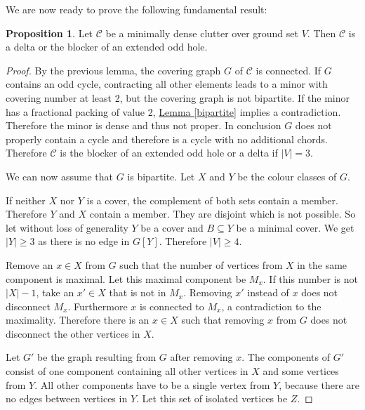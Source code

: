 \documentclass[a4paper, 12pt, twoside=false]{scrbook}
\theoremstyle{definition}
\newtheorem{proposition}[theorem]{Proposition}
\begin{document}
   We are now ready to prove the following fundamental result:

   \begin{proposition}\label{mindense}
       Let $\mathcal{C}$ be a minimally dense clutter over ground set $V$.
       Then $\mathcal{C}$ is a delta or the blocker of an extended odd hole.
   \end{proposition}

   \begin{proof}
       By the previous lemma, the covering graph $G$ of $\mathcal{C}$ is connected.
       If $G$ contains an odd cycle, contracting all other elements leads to a minor with covering number at least 2, but the covering graph is not bipartite.
       If the minor has a fractional packing of value 2, \hyperref[bipartite]{Lemma \ref*{bipartite}} implies a contradiction. Therefore the minor is dense and thus not proper.
       In conclusion $G$ does not properly contain a cycle and therefore is a cycle with no additional chords.
       Therefore $\mathcal{C}$ is the blocker of an extended odd hole or a delta if $|V|=3$.

       We can now assume that $G$ is bipartite.
       Let $X$ and $Y$ be the colour classes of $G$.

       If neither $X$ nor $Y$ is a cover, the complement of both sets contain a member. Therefore $Y$ and $X$ contain a member. They are disjoint which is not possible.
       So let without loss of generality $Y$ be a cover and $B \subseteq Y$ be a minimal cover.
       We get $|Y|\geq 3$ as there is no edge in $G[Y]$.
       Therefore $|V|\geq 4$.

       Remove an $x \in X$ from $G$ such that the number of vertices from $X$ in the same component is maximal.
       Let this maximal component be $M_x$.
       If this number is not $|X|-1$, take an $x' \in X$ that is not in $M_x$.
       Removing $x'$ instead of $x$ does not disconnect $M_x$. Furthermore $x$ is connected to $M_x$, a contradiction to the maximality.
       Therefore there is an $x \in X$ such that removing $x$ from $G$ does not disconnect the other vertices in $X$.

       Let $G'$ be the graph resulting from $G$ after removing $x$.
       The components of $G'$ consist of one component containing all other vertices in $X$ and some vertices from $Y$.
       All other components have to be a single vertex from $Y$, because there are no edges between vertices in $Y$.
       Let this set of isolated vertices be $Z$.


\end{proof}
\end{document}
